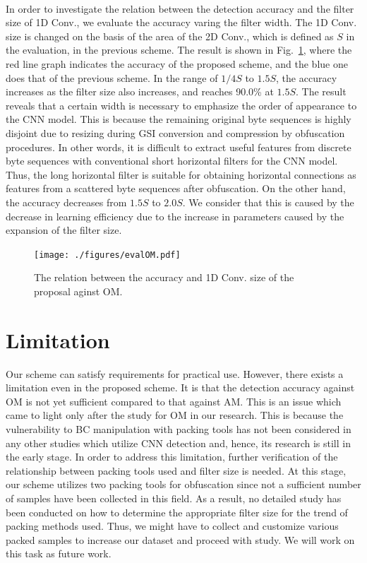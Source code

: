 \documentclass{ieeeaccess}
\newcommand{\myfigurename}{Fig.}
\begin{document}
\paragraph*{}
In order to investigate the relation between the detection accuracy and the filter size of 1D Conv., we evaluate the accuracy varing the filter width.
The 1D Conv. size is changed on the basis of the area of the 2D Conv., which is defined as $S$ in the evaluation, in the previous scheme.
The result is shown in \myfigurename~\ref{fig:evalOM}, where the red line graph indicates the accuracy of the proposed scheme, and the blue one does that of the previous scheme.
In the range of $1/4S$ to $1.5S$, the accuracy increases as the filter size also increases, and reaches 90.0\% at $1.5S$.
The result reveals that a certain width is necessary to emphasize the order of appearance to the CNN model.
This is because the remaining original byte sequences is highly disjoint due to resizing during GSI conversion and compression by obfuscation procedures.
In other words, it is difficult to extract useful features from discrete byte sequences with conventional short horizontal filters for the CNN model.
Thus, the long horizontal filter is suitable for obtaining horizontal connections as features from a scattered byte sequences after obfuscation.
On the other hand, the accuracy decreases from $1.5S$ to $2.0S$.
We consider that this is caused by the decrease in learning efficiency due to the increase in parameters caused by the expansion of the filter size.

\begin{figure}[t]
 \centering
 \texttt{[image: ./figures/evalOM.pdf]}
 \caption{The relation between the accuracy and 1D Conv. size of the proposal aginst OM.} 
 \label{fig:evalOM}
\end{figure}

\section{Limitation} \label{sec:limitation}
Our scheme can satisfy requirements for practical use.
However, there exists a limitation even in the proposed scheme.
It is that the detection accuracy against OM is not yet sufficient compared to that against AM.
This is an issue which came to light only after the study for OM in our research.
This is because the vulnerability to BC manipulation with packing tools has not been considered in any other studies which utilize CNN detection \cite{previous} and, hence, its research is still in the early stage.
In order to address this limitation, further verification of the relationship between packing tools used and filter size is needed.
At this stage, our scheme utilizes two packing tools for obfuscation since not a sufficient number of samples have been collected in this field\cite{attack2}.
As a result, no detailed study has been conducted on how to determine the appropriate filter size for the trend of packing methods used.
Thus, we might have to collect and customize various packed samples to increase our dataset and proceed with study.
We will work on this task as future work.
\end{document}
